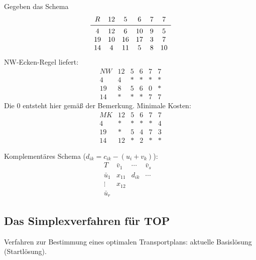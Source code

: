     \begin{example}
        Gegeben das Schema
        $$
        \begin{matrix}
            R & 12 & 5 & 6 & 7 & 7\\
            \midrule
            4 & 12 & 6 & 10 & 9 & 5\\
            19 & 10 & 16 & 17 & 3 & 7\\
            14 & 4 & 11 & 5 & 8 & 10
        \end{matrix}
        $$
        NW-Ecken-Regel liefert:
        $$
        \begin{matrix}
            NW & 12 & 5 & 6 & 7 & 7\\
            4 & 4 & \ast & \ast & \ast & \ast\\
            19 & 8 & 5 & 6 & 0 & \ast\\
            14 & \ast & \ast & \ast & 7 & 7
        \end{matrix}
        $$
        Die $0$ entsteht hier gemäß der Bemerkung.
        Minimale Kosten:
        $$
        \begin{matrix}
            MK & 12 & 5 & 6 & 7 & 7\\
            4 & \ast & \ast & \ast & \ast & 4\\
            19 & \ast & 5 & 4 & 7 & 3 \\
            14 & 12 & \ast & 2 & \ast & \ast
        \end{matrix}
        $$
    \end{example}

    Komplementäres Schema ($d_{ik}=c_{ik}-(u_i+v_k)$):
    $$
    \begin{matrix}
        T & \bar v_1 & \cdots & \bar v_s\\
        \bar u_1 & x_{11} & d_{ik} & \cdots & \\
        \vdots & x_{12} & \\
        \bar u_r & 
    \end{matrix}
    $$
    \subsection{Das Simplexverfahren für TOP}

    Verfahren zur Bestimmung eines optimalen Transportplans: aktuelle Basislösung (Startlösung).

